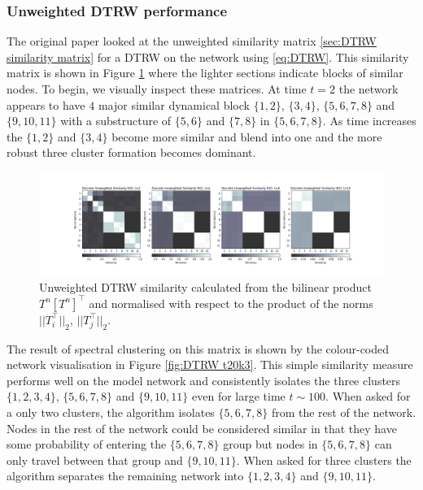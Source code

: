 \documentclass[12pt,a4paper]{article}
\begin{document}
\subsubsection{Unweighted DTRW performance}
The original paper \cite{schaub2019multiscale} looked at the unweighted similarity matrix \ref{sec:DTRW similarity matrix} for a DTRW on the network using \ref{eq:DTRW}. This similarity matrix is shown in Figure \ref{fig:DTRW toy sim} where the lighter sections indicate blocks of similar nodes. To begin, we visually inspect these matrices. At time $t=2$ the network appears to have $4$ major similar dynamical block $\{1,2\}$, $\{3,4\}$, $\{5,6,7,8\}$ and $\{9,10,11\}$ with a substructure of $\{ 5,6 \}$ and $\{7,8\}$ in $\{5,6,7,8\}$. As time increases the $\{1,2\}$ and $\{3,4\}$ become more similar and blend into one and the more robust three cluster formation becomes dominant.

\begin{figure}[H]
    \centering
    \includegraphics[width=\textwidth]{toy_net/DTRWu_Similarity_toy_net.png}
    \caption{Unweighted DTRW similarity calculated from the bilinear product $ T^n [T^n]^\top$ and normalised with respect to the product of the norms $||T_i^\top||_2 $, $||T_j^\top||_2$.}
    \label{fig:DTRW toy sim}
\end{figure}

\noindent The result of spectral clustering on this matrix is shown by the colour-coded network visualisation in Figure \ref{fig:DTRW t20k3}. This simple similarity measure performs well on the model network and consistently isolates the three clusters $\{ 1,2, 3,4\}$, $\{ 5,6,7,8\}$ and $\{ 9,10,11\}$ even for large time $t \sim 100$. When asked for a only two clusters, the algorithm isolates $\{ 5,6,7,8\}$ from the rest of the network. Nodes in the rest of the network could be considered similar in that they have some probability of entering the $\{ 5,6,7,8\}$ group but nodes in $\{ 5,6,7,8\}$ can only travel between that group and $\{ 9,10,11\}$. When asked for three clusters the algorithm separates the remaining network into $\{ 1,2,3,4\}$ and $\{ 9,10,11\}$.
\end{document}
